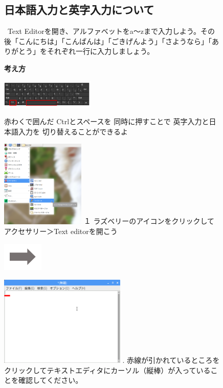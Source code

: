 \documentclass[a4paper,12pt]{jarticle}
\begin{document}
\clearpage
\begin{figure}[ht]
  \subsection{\theExercise 日本語入力と英字入力について}
  \ Text
  Editorを開き、アルファベットをa〜zまで入力しよう。その後「こんにちは」「こんばんは」「ごきげんよう」「さようなら」「ありがとう」をそれぞれ一行に入力しましょう。

  {\bf\large 考え方}


  \centering
  \begin{minipage}{\textwidth}
    \includegraphics[width=0.4\textwidth]{textbook-img065.png}
    \raisebox{10mm}
    {
      \begin{minipage}{0.5\textwidth}
        赤わくで囲んだ
        Ctrlとスペースを
        同時に押すことで
        英字入力と日本語入力を
        切り替えることができるよ
      \end{minipage}
    }
  \end{minipage}

  \begin{minipage}{0.4\textwidth}
    \includegraphics[width=4cm]{textbook-img064.png}
    \flushleft
    １
    ラズベリーのアイコンをクリックしてアクセサリー＞Text
    editorを開こう
  \end{minipage}
  \includegraphics[width=1.919cm]{textbook-img053.png}
  \begin{minipage}{7.347cm}
    \includegraphics[width=6cm]{textbook-img063.png}
    .
    赤線が引かれているところをクリックしてテキストエディタにカーソル（縦棒）が入っていることを確認してください。
  \end{minipage}


\end{figure}
\end{document}
